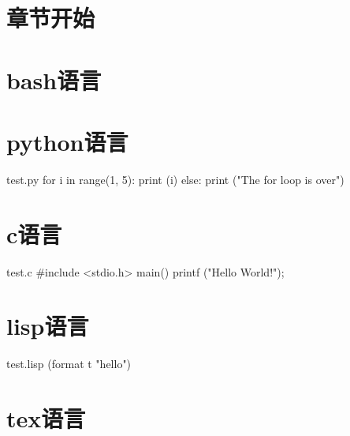 \documentclass[11pt,oneside]{book}
\newlength{\textpt}
\newif\ifphone
\begin{document}
\begin{common-format}
\mainmatter

\chapter{章节开始}

\chapter{bash语言}

\chapter{python语言}
\begin{xverbatim}[129]{test.py}
for i in range(1, 5):
    print (i)
else:
    print ("The for loop is over")
\end{xverbatim}

\chapter{c语言}
\begin{xverbatim}[129]{test.c}
#include <stdio.h>
main()
{
printf ("Hello World!\n");
}
\end{xverbatim}

\chapter{lisp语言}
\begin{xverbatim}[129]{test.lisp}
(format t "hello")
\end{xverbatim}

\chapter{tex语言}
\end{common-format}
\end{document}
